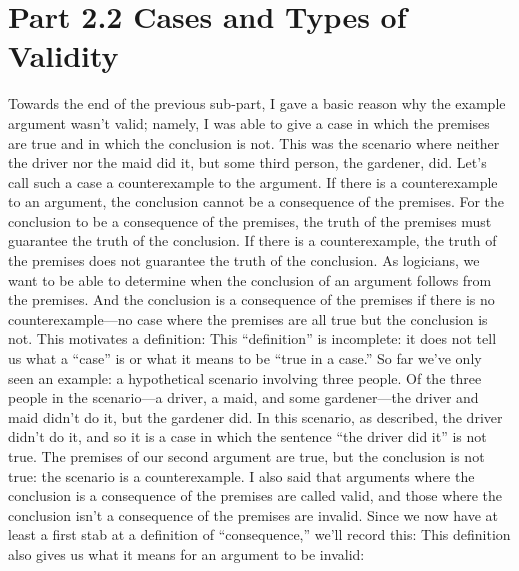 \section{Part 2.2 Cases and Types of Validity}
Towards the end of the previous sub-part, I gave a basic reason why the example argument wasn't valid; namely, I was able to give a case in which the premises are true and in which the conclusion is not. This was the scenario where neither the driver nor the maid did it, but some third person, the gardener, did. Let’s call such a case a counterexample to the argument. If there is a counterexample to an argument, the conclusion cannot be a consequence of the premises. For the conclusion to be a consequence of the premises, the truth of the premises must guarantee the truth of the conclusion. If there is a counterexample, the truth of the premises does not guarantee the truth of the conclusion. As logicians, we want to be able to determine when the conclusion of an argument follows from the premises. And the conclusion is a consequence of the premises if there is no counterexample—no case where the premises are all true but the conclusion is not. This motivates a definition:
This “definition” is incomplete: it does not tell us what a “case” is or what it means to be “true in a case.” So far we’ve only seen an example: a hypothetical scenario involving three people. Of the three people in the scenario—a driver, a maid, and some gardener—the driver and maid didn’t do it, but the gardener did. In this scenario, as described, the driver didn’t do it, and so it is a case in which the sentence “the driver did it” is not true. The premises of our second argument are true, but the conclusion is not true: the scenario is a counterexample. I also said that arguments where the conclusion is a consequence of the premises are called valid, and those where the conclusion isn’t a consequence of the premises are \gls{invalid}. Since we now have at least a first stab at a definition of “consequence,” we’ll record this:
This definition also gives us what it means for an argument to be invalid:
